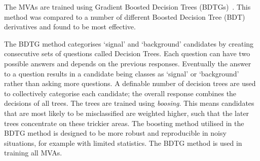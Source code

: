 The MVAs are trained using Gradient Boosted Decision Trees (BDTGs)~\cite{Breiman}. This method was compared to a number of different Boosted Decision Tree (BDT) derivatives and found to be most effective.

The BDTG method categorises `signal' and `background' candidates by creating consecutive sets of questions called Decision Trees. Each question can have two possible answers and depends on the previous responses. Eventually the answer to a question results in a candidate being classes as `signal' or `background' rather than asking more questions. A definable number of decision trees are used to collectively categorise each candidate; the overall response combines the decisions of all trees. The trees are trained using \emph{boosing}. This means candidates that are most likely to be misclassified are weighted higher, such that the later trees concentrate on these trickier areas.  
The boosting method utilised in the BDTG method is designed to be more robust and reproducible in noisy situations, for example with limited statistics. 
The BDTG method is used in training all MVAs.



